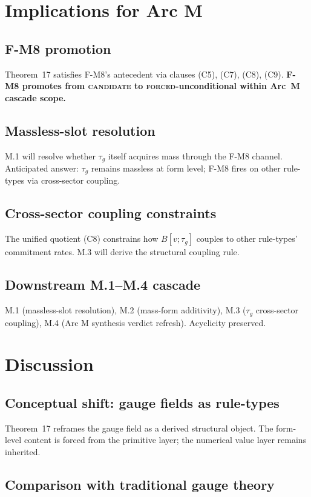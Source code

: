 \documentclass[11pt,a4paper]{article}
\begin{document}
\section{Implications for Arc M}

\subsection{F-M8 promotion}
Theorem~17 satisfies F-M8's antecedent via clauses (C5), (C7), (C8), (C9). \textbf{F-M8 promotes from \textsc{candidate} to \textsc{forced}-unconditional within Arc~M cascade scope.}

\subsection{Massless-slot resolution}
M.1 will resolve whether $\tau_g$ itself acquires mass through the F-M8 channel. Anticipated answer: $\tau_g$ remains massless at form level; F-M8 fires on other rule-types via cross-sector coupling.

\subsection{Cross-sector coupling constraints}
The unified quotient (C8) constrains how $B[v;\tau_g]$ couples to other rule-types' commitment rates. M.3 will derive the structural coupling rule.

\subsection{Downstream M.1--M.4 cascade}
M.1 (massless-slot resolution), M.2 (mass-form additivity), M.3 ($\tau_g$ cross-sector coupling), M.4 (Arc M synthesis verdict refresh). Acyclicity preserved.

\section{Discussion}

\subsection{Conceptual shift: gauge fields as rule-types}
Theorem~17 reframes the gauge field as a derived structural object. The form-level content is forced from the primitive layer; the numerical value layer remains inherited.

\subsection{Comparison with traditional gauge theory}
\end{document}
